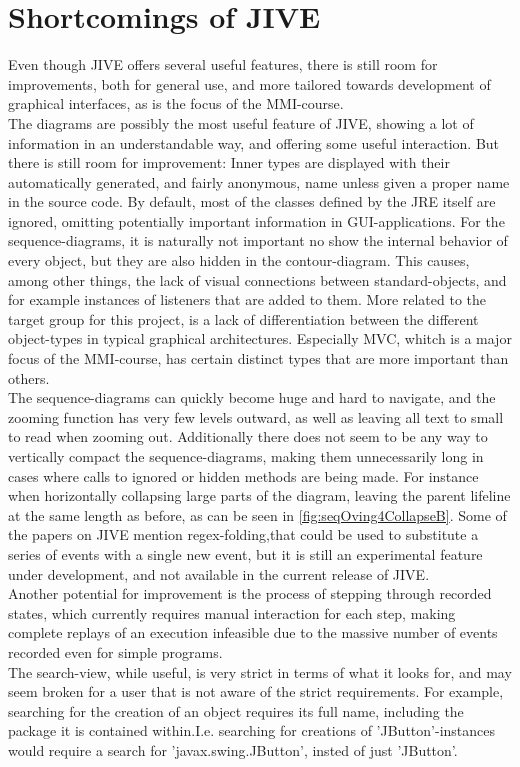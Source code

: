 \section{Shortcomings of JIVE}\label{jiveShortcomings}

Even though JIVE offers several useful features, there is still room for improvements, both for general use, and more tailored towards development of graphical interfaces, as is the focus of the MMI-course.
~\\

The diagrams are possibly the most useful feature of JIVE, showing a lot of information in an understandable way, and offering some useful interaction.
But there is still room for improvement:
Inner types are displayed with their automatically generated, and fairly anonymous, name unless given a proper name in the source code.
By default, most of the classes defined by the JRE itself are ignored, omitting potentially important information in GUI-applications.
For the sequence-diagrams, it is naturally not important no show the internal behavior of every object, but they are also hidden in the contour-diagram.
This causes, among other things, the lack of visual connections between standard-objects, and for example instances of listeners that are added to them.
More related to the target group for this project, is a lack of differentiation between the different object-types in typical graphical architectures.
Especially MVC, whitch is a major focus of the MMI-course, has certain distinct types that are more important than others.
~\\

The sequence-diagrams can quickly become huge and hard to navigate, and the zooming function has very few levels outward, as well as leaving all text to small to read when zooming out.
Additionally there does not seem to be any way to vertically compact the sequence-diagrams, making them unnecessarily long in cases where calls to ignored or hidden methods are being made.
For instance when horizontally collapsing large parts of the diagram, leaving the parent lifeline at the same length as before, as can be seen in \autoref{fig:seqOving4CollapseB}.
Some of the papers on JIVE mention regex-folding,that could be used to substitute a series of events with a single new event, but it is still an experimental feature under development, and not available in the current release of JIVE.
~\\

Another potential for improvement is the process of stepping through recorded states, which currently requires manual interaction for each step, making complete replays of an execution infeasible due to the massive number of events recorded even for simple programs.
~\\

The search-view, while useful, is very strict in terms of what it looks for, and may seem broken for a user that is not aware of the strict requirements.
For example, searching for the creation of an object requires its full name, including the package it is contained within.I.e. searching for creations of 'JButton'-instances would require a search for 'javax.swing.JButton', insted of just 'JButton'.
~\\
